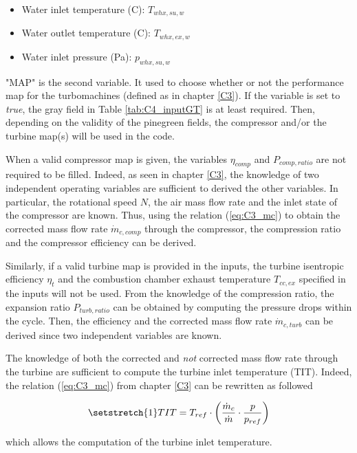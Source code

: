 \begin{itemize}
\item Water inlet temperature (\degree C): $T_{whx,su,w}$
\item Water outlet temperature (\degree C): $T_{whx,ex,w}$
\item Water inlet pressure (Pa): $p_{whx,su,w}$
\end{itemize}

"MAP" is the second variable. It used to choose whether or not the performance map for the turbomachines (defined as in chapter \ref{C3}). If the variable is set to \textit{true}, the {\color{Gray} gray} field in Table \ref{tab:C4_inputGT} is at least required. Then, depending on the validity of the {\color{PineGreen} pinegreen} fields, the compressor and/or the turbine map(s) will be used in the code. 

When a valid compressor map is given, the variables $\eta_{comp}$ and $P_{comp,ratio}$ are not required to be filled. Indeed, as seen in chapter \ref{C3}, the knowledge of two independent operating variables are sufficient to derived the other variables. In particular, the rotational speed $N$, the air mass flow rate and the inlet state of the compressor are known. Thus, using the relation (\ref{eq:C3_mc}) to obtain the corrected mass flow rate $\dot{m}_{c,comp}$ through the compressor, the compression ratio and the compressor efficiency can be derived.  

Similarly, if a valid turbine map is provided in the inputs, the turbine isentropic efficiency $\eta_{t}$ and the combustion chamber exhaust temperature $T_{cc,ex}$ specified in the inputs will not be used. From the knowledge of the compression ratio, the expansion ratio $P_{turb,ratio}$ can be obtained by computing the pressure drops within the cycle. Then, the efficiency and the corrected mass flow rate $\dot{m}_{c,turb}$ can be derived since two independent variables are known.

The knowledge of both the corrected and \textit{not} corrected mass flow rate through the turbine are sufficient to compute the turbine inlet temperature (TIT). Indeed, the relation (\ref{eq:C3_mc}) from chapter \ref{C3} can be rewritten as followed

\begin{equation}
    \setstretch{1}
TIT =T_{ref}\cdot \left(\frac{\dot{m}_c}{\dot{m}}\cdot\frac{p}{p_{ref}}\right)
\end{equation} 

which allows the computation of the turbine inlet temperature.
\newpage
